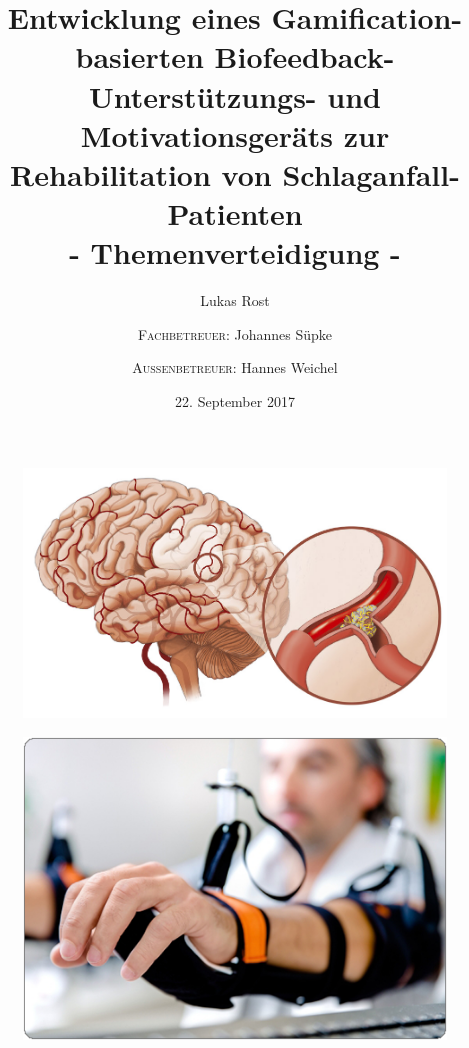 \documentclass[hyphens]{beamer}
\begin{document}
  \title[Gerät zur Schlaganfall-Rehabilitation]{Entwicklung eines Gamification-basierten Biofeedback-Unterstützungs- und Motivationsgeräts zur Rehabilitation von Schlaganfall-Patienten \\ \small{- Themenverteidigung -}}
  \author[Lukas Rost]{Lukas Rost  \\ \and \textsc{Fachbetreuer:} Johannes Süpke \and \textsc{Außenbetreuer:} Hannes Weichel}
  \date{22. September 2017} 
  
 \begin{frame}
 \titlepage
 \end{frame}
 
  \begin{frame}
  \begin{figure}
\includegraphics[scale=0.3]{pics/einleit2.jpg}
\end{figure}
 \end{frame}
 
 \begin{frame}
 \begin{figure}
\includegraphics[scale=0.6]{pics/einleit1.png}
\end{figure}
 \end{frame}
 
\end{document}
